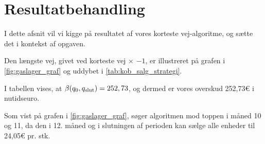 \section{Resultatbehandling}

I dette afsnit vil vi kigge på resultatet af vores korteste vej-algoritme, og sætte det i kontekst af opgaven.

Den længste vej, givet ved korteste vej $\times$ $-1$, er illustreret på grafen i  \autoref{fig:gaslager_graf} og uddybet i \autoref{tab:kob_salg_strategi}.

I tabellen vises, at $\beta (q_0, q_{\textrm{slut}}) = 252,73$, og dermed er vores overskud 252,73€ i nutidseuro. 

Som vist på grafen i \autoref{fig:gaslager_graf}, søger algoritmen mod toppen i måned 10 og 11, da den i 12. måned og i slutningen af perioden kan sælge alle enheder til 24,05€ pr. stk. 

